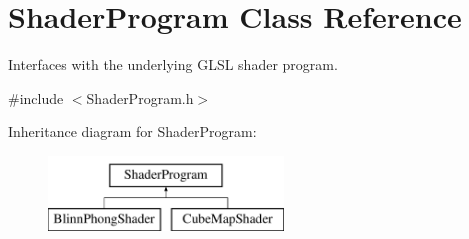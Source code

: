\hypertarget{class_shader_program}{}\section{Shader\+Program Class Reference}
\label{class_shader_program}


Interfaces with the underlying G\+L\+SL shader program.  




{\ttfamily \#include $<$Shader\+Program.\+h$>$}

Inheritance diagram for Shader\+Program\+:\begin{figure}[H]
\begin{center}
\leavevmode
\includegraphics[height=2.000000cm]{class_shader_program}
\end{center}
\end{figure}
